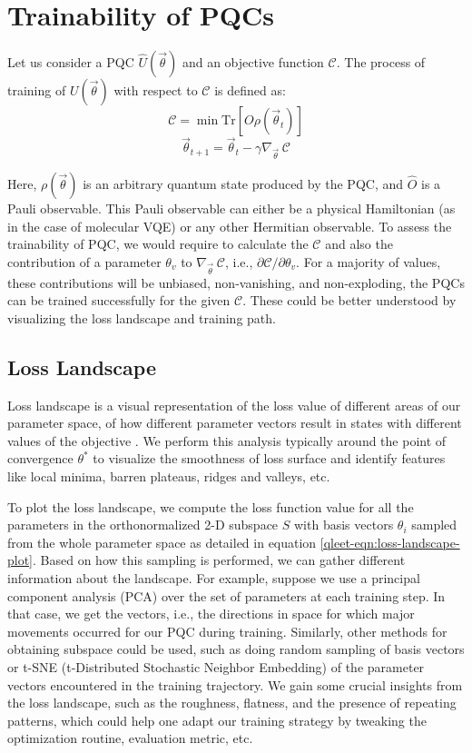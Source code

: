 \section{Trainability of PQCs}

Let us consider a PQC $\hat{U}(\vec{\theta})$ and an objective function $\mathcal{C}$. The process of training of $U(\vec{\theta})$ with respect to $\mathcal{C}$ is defined as:
\begin{equation}
	\mathcal{C} = \min \text{Tr}[O\rho(\vec{\theta}_t)]
\end{equation}
\begin{equation}
     \vec{\theta}_{t+1} = \vec{\theta}_t - \gamma\nabla_{\vec{\theta}}\ \mathcal{C}
\end{equation}

Here, $\rho(\vec{\theta})$ is an arbitrary quantum state produced by the PQC, and $\hat{O}$ is a Pauli observable. This Pauli observable can either be a physical Hamiltonian (as in the case of molecular VQE) or any other Hermitian observable. To assess the trainability of PQC, we would require to calculate the $\mathcal{C}$ and also the contribution of a parameter $\theta_v$ to $\nabla_{\vec{\theta}}\ \mathcal{C}$, i.e., $\partial\mathcal{C}/\partial\theta_v$. For a majority of values, these contributions will be unbiased, non-vanishing, and non-exploding, the PQCs can be trained successfully for the given $\mathcal{C}$. These could be better understood by visualizing the loss landscape and training path.

\subsection{Loss Landscape}

Loss landscape is a visual representation of the loss value of different areas of our parameter space, of how different parameter vectors result in states with different values of the objective . We perform this analysis typically around the point of convergence $\theta^*$ to visualize the smoothness of loss surface and identify features like local minima, barren plateaus, ridges and valleys, etc. \cite{loss-landscapes}

To plot the loss landscape, we compute the loss function value for all the parameters in the orthonormalized 2-D subspace $S$ with basis vectors $\theta_i$ sampled from the whole parameter space as detailed in equation \ref{qleet-eqn:loss-landscape-plot}. Based on how this sampling is performed, we can gather different information about the landscape. For example, suppose we use a principal component analysis (PCA) over the set of parameters at each training step. In that case, we get the vectors, i.e., the directions in space for which major movements occurred for our PQC during training. Similarly, other methods for obtaining subspace could be used, such as doing random sampling of basis vectors or t-SNE (t-Distributed Stochastic Neighbor Embedding) of the parameter vectors encountered in the training trajectory. We gain some crucial insights from the loss landscape, such as the roughness, flatness, and the presence of repeating patterns, which could help one adapt our training strategy by tweaking the optimization routine, evaluation metric, etc. 


